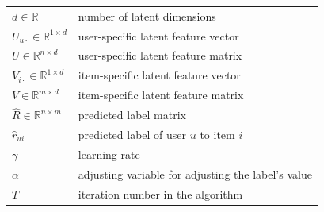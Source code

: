 \documentclass[sigconf]{acmart}
\begin{document}
\begin{table}[!htb]
\begin{center}
\begin{tabular}{ l|l}
			
			$d \in \mathbb{R}$ & number of latent dimensions\\
			
			$U_{u\cdot} \in \mathbb{R}^{1\times d}$ & user-specific latent feature vector\\
			
			$U \in \mathbb{R}^{n\times d}$ & user-specific latent feature matrix\\
			
			$V_{i\cdot} \in \mathbb{R}^{1\times d}$ & item-specific latent feature vector\\
			
			$V \in \mathbb{R}^{m\times d}$ & item-specific latent feature matrix\\
			\hline
			$\hat{R} \in \mathbb{R}^{n \times m}$ &  predicted label matrix\\
			$\hat{r}_{ui}$ & predicted label of user $u$ to item $i$\\
			\hline
			
			$\gamma $ & learning rate\\
			
			
			$\alpha$ & adjusting variable for adjusting the label's value\\
			
			
			$T$ & iteration number in the algorithm\\
			
			
			\hline\hline
		\end{tabular}
		
	\end{center}
\end{table}
\end{document}
